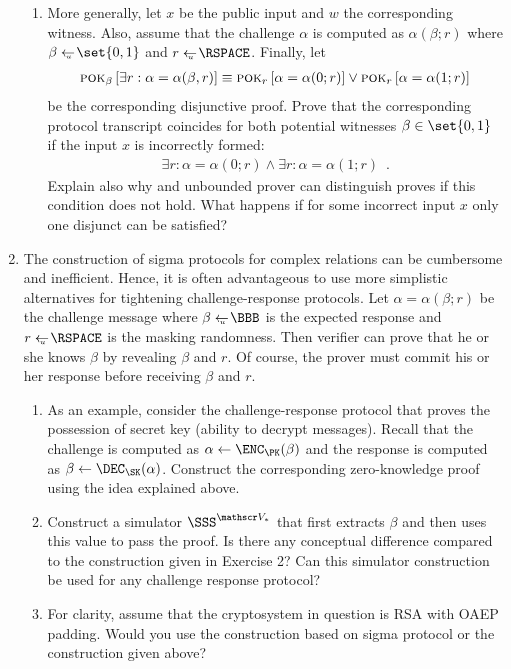 \documentclass{article}
\begin{document}
\begin{enumerate}
\begin{enumerate}
    \item More generally, let $x$ be the public input and $w$ the
      corresponding witness. Also, assume that the challenge $\alpha$
      is computed as $\alpha(\beta;r)$ where $\beta\getsu\set{0,1}$
      and $r\getsu\RSPACE$. Finally, let
      \begin{align*}
        \textsc{pok}_{\beta}\left[\exists r: \alpha=\alpha(\beta,r)\right]\equiv
        \textsc{pok}_{r}\left[\alpha=\alpha(0;r)\right]\vee \textsc{pok}_{r}\left[\alpha=\alpha(1;r)\right]
      \end{align*}
      be the corresponding disjunctive proof. Prove that the
      corresponding protocol transcript coincides for both potential
      witnesses $\beta\in\set{0,1}$ if the input $x$ is incorrectly
      formed:
      \begin{align*}
        \exists r: \alpha=\alpha(0;r)\wedge \exists r: \alpha=\alpha(1;r) \enspace.
      \end{align*}
      Explain also why and unbounded prover can distinguish proves if
      this condition does not hold. What happens if for some incorrect
      input $x$ only one disjunct can be satisfied?
    \end{enumerate}
  \item The construction of sigma protocols for complex relations can
    be cumbersome and inefficient. Hence, it is often advantageous to
    use more simplistic alternatives for tightening challenge-response
    protocols. Let $\alpha=\alpha(\beta;r)$ be the challenge message
    where $\beta\getsu\BBB$ is the expected response and
    $r\getsu\RSPACE$ is the masking randomness. Then verifier can
    prove that he or she knows $\beta$ by revealing $\beta$ and
    $r$. Of course, the prover must commit his or her response before
    receiving $\beta$ and $r$.
    \begin{enumerate}
    \item As an example, consider the challenge-response protocol that
      proves the possession of secret key (ability to decrypt
      messages). Recall that the challenge is computed as
      $\alpha\gets\ENC_\PK(\beta)$ and the response is computed as
      $\beta\gets\DEC_\SK(\alpha)$.  Construct the corresponding
      zero-knowledge proof using the idea explained above.
    \item Construct a simulator $\SSS^{\VERIFIER_*}$ that first
      extracts $\beta$ and then uses this value to pass the proof. Is
      there any conceptual difference compared to the construction
      given in Exercise 2? Can this simulator construction be used for
      any challenge response protocol?
    \item For clarity, assume that the cryptosystem in question is RSA
      with OAEP padding. Would you use the construction based on sigma
      protocol or the construction given above?
    \end{enumerate}


\end{enumerate}
\end{document}
